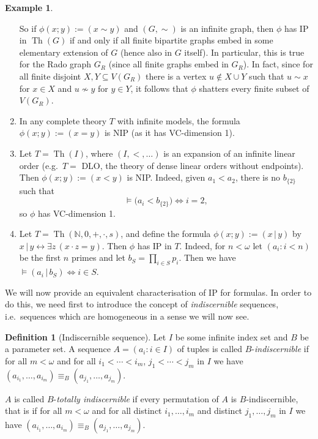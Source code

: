 \documentclass[a4paper]{report}
\newcommand{\ind}{\hspace{15pt}}
\newcommand{\Nat}{\mathbb{N}}
\renewcommand{\iff}{\Leftrightarrow}
\newcommand{\siff}{\leftrightarrow}
\DeclareMathOperator{\Th}{Th}
\theoremstyle{definition}
\newtheorem{defn}[thm]{Definition}
\newtheorem{exmp}[thm]{Example}
\theoremstyle{remstyle}
\begin{document}
\begin{exmp}
\begin{enumerate}[itemsep=12pt]
		      So if $\phi(x;y):=(x\sim y)$ and $(G,\sim)$ is an infinite graph, then $\phi$ has IP in $\Th(G)$ if and only if all finite bipartite graphs embed in some elementary extension of $G$ (hence also in $G$ itself). In particular, this is true for the Rado graph $G_R$ (since all finite graphs embed in $G_R$). In fact, since for all finite disjoint $X,Y\subseteq V(G_R)$ there is a vertex $u\not\in X\cup Y$ such that $u\sim x$ for $x\in X$ and $u\not\sim y$ for $y\in Y$, it follows that $\phi$ shatters every finite subset of $V(G_R)$.

		\item In any complete theory $T$ with infinite models, the formula $\phi(x;y) :=(x=y)$ is NIP (as it has VC-dimension 1).

		\item Let $T=\Th(I)$, where $(I,<,\ldots)$ is an expansion of an infinite linear order (e.g.\ $T=$ DLO, the theory of dense linear orders without endpoints). Then $\phi(x;y):=(x<y)$ is NIP. Indeed, given $a_1<a_2$, there is no $b_{\{2\}}$ such that
		      \begin{equation*}
			      \models \big(a_i < b_{\{2\}}\big) \iff i=2,
		      \end{equation*}
		      so $\phi$ has VC-dimension 1.
		\item Let $T=\Th(\Nat,0,+,\cdot,s)$, and define the formula $\phi(x;y) := (x\,|\, y)$ by $x\,|\, y\siff\exists z\,(x\cdot z=y)$. Then $\phi$ has IP in $T$. Indeed, for $n<\omega$ let $(a_i:i<n)$ be the first $n$ primes and let $b_S=\prod_{i\in S}p_i$. Then we have $\models (a_i\,|\, b_S)\iff i\in S$.
	\end{enumerate}
\end{exmp}

\ind We will now provide an equivalent characterisation of IP for formulas. In order to do this, we need first to introduce the concept of \emph{indiscernible} sequences, i.e.\ sequences which are homogeneous in a sense we will now see.

\begin{defn}[Indiscernible sequence]
	Let $I$ be some infinite index set and $B$ be a parameter set. A sequence $A=(a_i:i\in I)$ of tuples is called $B$-\emph{indiscernible} if for all $m<\omega$ and for all $i_1<\cdots<i_m$, $j_1<\cdots<j_m$ in $I$ we have $(a_{i_1},\ldots,a_{i_m})\equiv_B(a_{j_1},\ldots, a_{j_m})$.

	$A$ is called $B$-\emph{totally indiscernible} if every permutation of $A$ is $B$-indiscernible, that is if for all $m<\omega$ and for all distinct $i_1,\ldots,i_m$ and distinct $j_1,\ldots,j_m$ in $I$ we have $(a_{i_1},\ldots,a_{i_m})\equiv_B(a_{j_1},\ldots, a_{j_m})$.
\end{defn}
\end{document}
